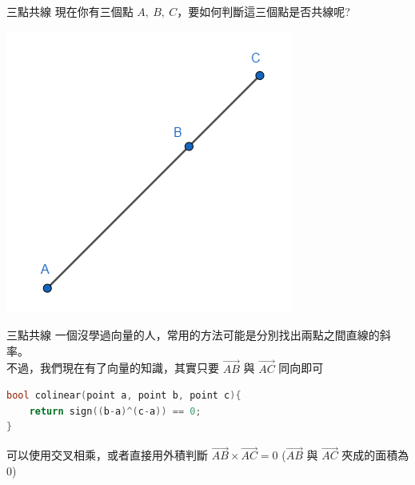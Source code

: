 \documentclass[aspectratio=169]{beamer}
\begin{document}
\begin{frame}[fragile]{三點共線}
    現在你有三個點 $A, \ B, \ C$，要如何判斷這三個點是否共線呢?
    \begin{center}
        \includegraphics[scale=0.6]{images/colinear.png}
    \end{center}
\end{frame}

\begin{frame}[fragile]{三點共線}
    一個沒學過向量的人，常用的方法可能是分別找出兩點之間直線的斜率。 \\
    \vspace{5mm}
    不過，我們現在有了向量的知識，其實只要 $\overrightarrow{AB}$ 與 $\overrightarrow{AC}$ 同向即可 \\
    \begin{lstlisting}[language=C++,basicstyle=\ttfamily\small]
bool colinear(point a, point b, point c){
    return sign((b-a)^(c-a)) == 0;
}
    \end{lstlisting}
    可以使用交叉相乘，或者直接用外積判斷 $\overrightarrow{AB} \times \overrightarrow{AC} = 0$ ($\overrightarrow{AB}$ 與 $\overrightarrow{AC}$ 夾成的面積為 $0$)
\end{frame}
\end{document}
